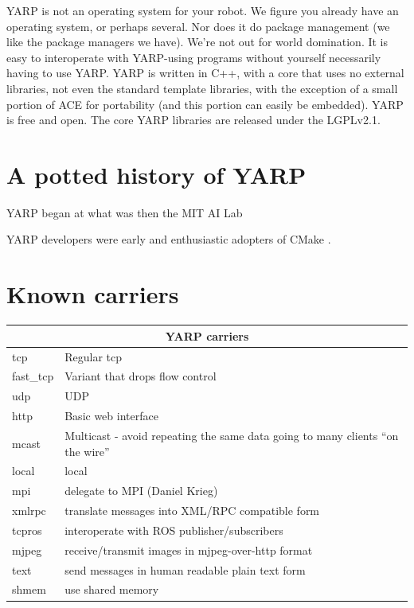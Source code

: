 \documentclass[letterpaper]{article}
\begin{document}
YARP is not an operating system for your robot. We figure you already
have an operating system, or perhaps several. Nor does it do package
management (we like the package managers we have). We're not out for
world domination. It is easy to interoperate with YARP-using programs
without yourself necessarily having to use YARP. 
YARP is written in C++, with a core that uses
no external libraries, not even the standard template libraries, with
the exception of a small portion of ACE for portability (and this
portion can easily be embedded). YARP is free and open.  The
core YARP libraries are released under the LGPLv2.1.


\section{A potted history of YARP}

YARP began at what was then the MIT AI Lab

YARP developers were early and enthusiastic adopters of CMake
 \cite{fitzpatrick10cmaking}.

\section{Known carriers}

\begin{tabular}{|l|p{7cm}|}
\hline
\multicolumn{2}{|c|}{YARP carriers} \\
\hline
tcp & Regular tcp \\
fast\_tcp & Variant that drops flow control \\
udp & UDP \\
http & Basic web interface \\
mcast & Multicast - avoid repeating the same data going
to many clients ``on the wire''  \\
local & local \\
mpi & delegate to MPI (Daniel Krieg) \\
xmlrpc & translate messages into XML/RPC compatible form \\
tcpros & interoperate with ROS publisher/subscribers \\
mjpeg & receive/transmit images in mjpeg-over-http format \\
text & send messages in human readable plain text form \\
shmem & use shared memory \\
\hline
\end{tabular}
\end{document}
